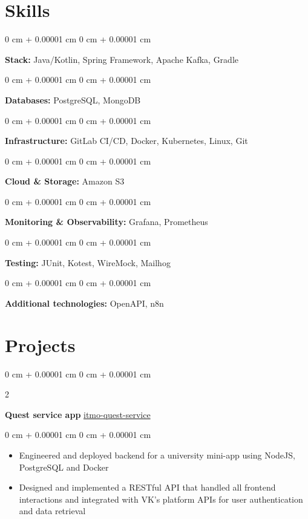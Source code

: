 \documentclass[10pt, letterpaper]{article}
\newenvironment{highlights}{
    \begin{itemize}[
        topsep=0.10 cm,
        parsep=0.10 cm,
        partopsep=0pt,
        itemsep=0pt,
        leftmargin=0 cm + 10pt
    ]
}{
    \end{itemize}
} %
\newenvironment{onecolentry}{
    \begin{adjustwidth}{
        0 cm + 0.00001 cm
    }{
        0 cm + 0.00001 cm
    }
}{
    \end{adjustwidth}
} %
\newenvironment{twocolentry}[2][]{
    \onecolentry
    \def\secondColumn{#2}
    \setcolumnwidth{\fill, 4.5 cm}
    \begin{paracol}{2}
}{
    \switchcolumn \raggedleft \secondColumn
    \end{paracol}
    \endonecolentry
} %
\begin{document}
\section{Skills}
        \begin{onecolentry}
        \textbf{Stack:} Java/Kotlin, Spring Framework, Apache Kafka, Gradle
        \end{onecolentry}
        \begin{onecolentry}
            \textbf{Databases:} PostgreSQL, MongoDB
        \end{onecolentry}
        \begin{onecolentry}
            \textbf{Infrastructure:} GitLab CI/CD, Docker, Kubernetes, Linux, Git
        \end{onecolentry}
        \begin{onecolentry}
            \textbf{Cloud \& Storage:} Amazon S3
        \end{onecolentry}
        \begin{onecolentry}
            \textbf{Monitoring \& Observability:} Grafana, Prometheus
        \end{onecolentry}
         \begin{onecolentry}
            \textbf{Testing:} JUnit, Kotest, WireMock, Mailhog
        \end{onecolentry}
        \begin{onecolentry}
            \textbf{Additional technologies:} OpenAPI, n8n
        \end{onecolentry}
\section{Projects}
        \begin{twocolentry}{
        \href{https://github.com/elizavetakotelnikova/itmo-quest-service}{itmo-quest-service}
        }
            \textbf{Quest service app} \end{twocolentry}

        \vspace{0.20 cm}
        \begin{onecolentry}
            \begin{highlights}
                \item Engineered and deployed backend for a university mini-app using NodeJS, PostgreSQL and Docker
                \item Designed and implemented a RESTful API that handled all frontend interactions and integrated with VK's platform APIs for user authentication and data retrieval
            \end{highlights}
        \end{onecolentry}
\end{document}
